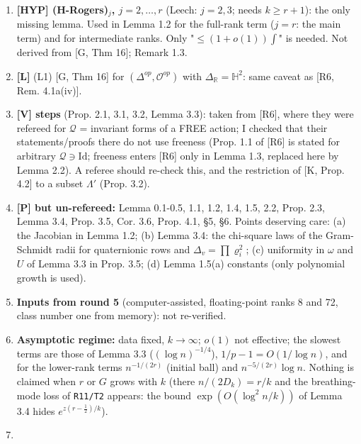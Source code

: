 \begin{enumerate}
\def\labelenumi{\arabic{enumi}.}
\tightlist
\item
  \textbf{{[}HYP{]} (H-Rogers)\(_j\), \(j=2,\dots,r\)} (Leech: \(j=2,3\); needs \(k\ge r+1\)): the only missing lemma. Used in Lemma 1.2 for the full-rank term (\(j=r\): the main term) and for intermediate ranks. Only "\(\le(1+o(1))\int\)" is needed. Not derived from {[}G, Thm 16{]}; Remark 1.3.
\item
  \textbf{{[}L{]}} (L1) {[}G, Thm 16{]} for \((\Delta^{op},\mathcal O^{op})\) with \(\Delta_{\mathbb R}=\mathbb H^2\): same caveat as {[}R6, Rem. 4.1a(iv){]}.
\item
  \textbf{{[}V{]} steps} (Prop. 2.1, 3.1, 3.2, Lemma 3.3): taken from {[}R6{]}, where they were refereed for \(\mathcal Q\) = invariant forms of a FREE action; I checked that their statements/proofs there do not use freeness (Prop. 1.1 of {[}R6{]} is stated for arbitrary \(\mathcal Q\ni\mathrm{Id}\); freeness enters {[}R6{]} only in Lemma 1.3, replaced here by Lemma 2.2). A referee should re-check this, and the restriction of {[}K, Prop. 4.2{]} to a subset \(\Lambda'\) (Prop. 3.2).
\item
  \textbf{{[}P{]} but un-refereed:} Lemma 0.1-0.5, 1.1, 1.2, 1.4, 1.5, 2.2, Prop. 2.3, Lemma 3.4, Prop. 3.5, Cor. 3.6, Prop. 4.1, §5, §6. Points deserving care: (a) the Jacobian in Lemma 1.2; (b) Lemma 3.4: the chi-square laws of the Gram-Schmidt radii for quaternionic rows and \(\Delta_v=\prod\varrho_i^2\); (c) uniformity in \(\omega\) and \(U\) of Lemma 3.3 in Prop. 3.5; (d) Lemma 1.5(a) constants (only polynomial growth is used).
\item
  \textbf{Inputs from round 5} (computer-assisted, floating-point ranks 8 and 72, class number one from memory): not re-verified.
\item
  \textbf{Asymptotic regime:} data fixed, \(k\to\infty\); \(o(1)\) not effective; the slowest terms are those of Lemma 3.3 (\((\log n)^{-1/4}\)), \(1/p-1=O(1/\log n)\), and for the lower-rank terms \(n^{-1/(2r)}\) (initial ball) and \(n^{-5/(2r)}\log n\). Nothing is claimed when \(r\) or \(G\) grows with \(k\) (there \(n/(2D_k)=r/k\) and the breathing-mode loss of \texttt{R11/T2} appears: the bound \(\exp(O(\log^2n/k))\) of Lemma 3.4 hides \(e^{z(r-\frac12)/k}\)).
\item

\end{enumerate}
